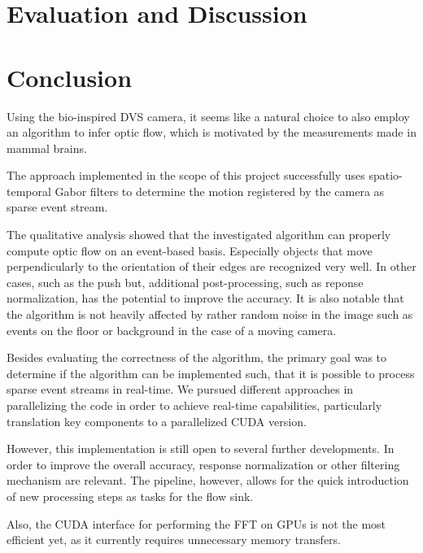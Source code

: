 \documentclass[a4paper,twoside, openright,12pt]{report}
\begin{document}




\chapter{Evaluation and Discussion}





\chapter{Conclusion}

Using the bio-inspired DVS camera, it seems like a natural choice to also employ an algorithm to infer optic flow, which is motivated by the measurements made in mammal brains.

The approach implemented in the scope of this project successfully uses spatio-temporal Gabor filters to determine the motion registered by the camera as sparse event stream.

The qualitative analysis showed that the investigated algorithm can properly compute optic flow on an event-based basis.
Especially objects that move perpendicularly to the orientation of their edges are recognized very well.
In other cases, such as the push but, additional post-processing, such as reponse normalization, has the potential to improve the accuracy.
It is also notable that the algorithm is not heavily affected by rather random noise in the image such as events on the floor or background in the case of a moving camera.

Besides evaluating the correctness of the algorithm, the primary goal was to determine if the algorithm can be implemented such, that it is possible to process sparse event streams in real-time.
We pursued different approaches in parallelizing the code in order to achieve real-time capabilities, particularly translation key components to a parallelized CUDA version.

However, this implementation is still open to several further developments.
In order to improve the overall accuracy, response normalization or other filtering mechanism are relevant.
The pipeline, however, allows for the quick introduction of new processing steps as tasks for the flow sink.

Also, the CUDA interface for performing the FFT on GPUs is not the most efficient yet, as it currently requires unnecessary memory transfers.
\end{document}
